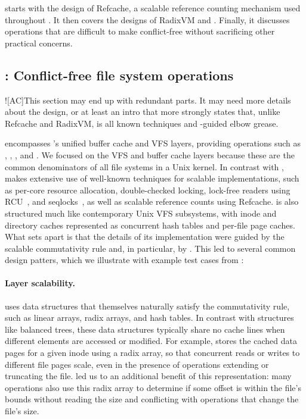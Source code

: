  starts with the design of Refcache, a scalable reference
counting mechanism used throughout \sys.  It then covers the designs
of RadixVM and \fs.  Finally, it discusses operations that are
difficult to make conflict-free without sacrificing other practical
concerns.





\subsection{\fs: Conflict-free file system operations}

\XXX![AC]{This section may end up with redundant parts.  It may need
  more details about the design, or at least an intro that more
  strongly states that, unlike Refcache and RadixVM, \fs is all known
  techniques and \tool-guided elbow grease.}

\fs encompasses \sys's unified buffer cache and VFS layers, providing
operations such as , , , and
.  We focused on the VFS and buffer cache layers because
these are the common denominators of all file systems in a Unix
kernel.
%
In contrast with \vm,
\fs makes extensive use of well-known techniques for scalable
implementations, such as per-core resource
allocation, double-checked locking, lock-free readers using
RCU~\cite{rcu:linux},
and seqlocks~\cite[\S6]{lameter:linuxsync},
as well as scalable reference counts using Refcache.
%
\fs is also structured much like contemporary Unix VFS subsystems,
with inode and directory caches represented as concurrent hash tables
and per-file page caches.
%
What sets \fs apart is that the details of its implementation were
guided by the scalable commutativity rule and, in particular, by
\tool.
%
This led to several common design patters, which we illustrate with
example test cases from \tool{}:
%


\paragraph{Layer scalability.}  \fs uses data structures that
themselves naturally satisfy the commutativity rule, such as linear
arrays, radix arrays, and hash tables.  In
contrast with structures like balanced trees, these data
structures
typically share no cache lines when different elements are accessed
or modified.  For example, \fs stores the cached data pages for a given inode
using a radix array, so that concurrent reads or writes to different
file pages scale, even in the presence of operations
extending or truncating the file.
\tool led us to an additional benefit of this representation:
many operations also use this radix array to determine if some offset
is within the file's bounds without reading the size and conflicting
with operations
that change the file's size.

